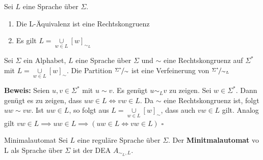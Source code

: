 \begin{bem}
    Sei $L$ eine Sprache über $\Sigma$.
    \begin{enumerate}[label=(\roman*)]
        \item Die L-Äquivalenz ist eine Rechtskongruenz
        \item Es gilt $L = \underset{w \in L}{\cup}[w]_{\sim_L}$
    \end{enumerate}
\end{bem}

\begin{prop}
    Sei $\Sigma$ ein Alphabet, $L$ eine Sprache über $\Sigma$ und $\sim$ eine Rechtskongruenz auf $\Sigma^*$ mit $L = \underset{w \in L}{\cup}[w]_\sim$. Die Partition $\nicefrac{\Sigma^*}{\sim}$ ist eine Verfeinerung von $\nicefrac{\Sigma^*}{\sim_L}$
    
    \textbf{Beweis:} Seien $u, v \in \Sigma^*$ mit $u \sim v $. Es genügt $u \sim_L v$ zu zeigen. Sei $w \in \Sigma^*$. Dann genügt es zu zeigen, dass $uw \in L \iff vw \in L$. Da $\sim$ eine Rechtskongruenz ist, folgt $uw \sim vw$. Ist $uw \in L$, so folgt aus $L = \underset{w \in L}{\cup}[w]_\sim$, dass auch $vw \in L$ gilt. Analog gilt $vw \in L \implies uw \in L \implies (uw \in L \iff vw \in L)$ \hspace*{\fill}$\square$
\end{prop}

\begin{defn}{Minimalautomat}
	Sei $L$ eine reguläre Sprache über $\Sigma$. Der \textbf{Minitmalautomat} vo L als Sprache über $\Sigma$ ist der DEA $A_{\sim_L, L}$.	
\end{defn}


